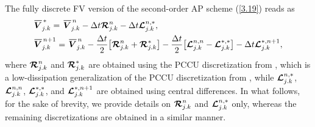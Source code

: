 \documentclass[A4paper,12pt,twoside]{article}
\numberwithin{equation}{section}
\numberwithin{figure}{section}
\numberwithin{table}{section}
\newcommand{\dt}{\Delta t}
\newcommand\eref[1]{(\ref{#1})}
\newcommand*\xbar[1]{%
  \hbox{%
    \vbox{%
      \hrule height 0.5pt %
      \kern0.4ex%
      \hbox{%
        \kern-0.05em%
        \ensuremath{#1}%
        \kern-0.00em%
      }%
    }%
  }%
}
\begin{document}
The fully discrete FV version of the second-order AP scheme \eref{3.19} reads as
\begin{align}
&\xbar{\bm V}^{\,*}_{j.k}=\,\xbar{\bm V}^{\,n}_{j.k}-\dt\bm{{\cal R}}^n_{j.k}-\dt\bm{{\cal L}}^{n,*}_{j.k},\label{3.31a}\\
&\xbar{\bm V}^{\,n+1}_{j.k}=\,\xbar{\bm V}^{\,n}_{j.k}-\frac{\dt}{2}\big[\bm{{\cal R}}^n_{j.k}+\bm{{\cal R}}^*_{j.k}\big]-
\frac{\dt}{2}\big[\bm{{\cal L}}^{n,n}_{j.k}-\bm{{\cal L}}^{*,*}_{j.k}\big]-\dt\bm{{\cal L}}^{*,n+1}_{j.k},\label{3.31b}
\end{align}
where $\bm{{\cal R}}^n_{j.k}$ and $\bm{{\cal R}}^*_{j.k}$ are obtained using the PCCU discretization from \cite{ACKM,CKN22}, which is a
low-dissipation generalization of the PCCU discretization from \cite{diaz2019path}, while $\bm{{\cal L}}^{n,*}_{j.k}$,
$\bm{{\cal L}}^{n,n}_{j.k}$, $\bm{{\cal L}}^{*,*}_{j.k}$, and $\bm{{\cal L}}^{*,n+1}_{j.k}$ are obtained using central differences. In what
follows, for the sake of brevity, we provide details on $\bm{{\cal R}}^n_{j.k}$ and $\bm{{\cal L}}^{n,*}_{j.k}$ only, whereas the remaining
discretizations are obtained in a similar manner.
\end{document}
